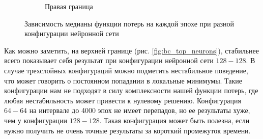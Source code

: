 \begin{figure}[ht]
    \hspace{0.5cm}
    \begin{subfigure}[b]{0.4\textwidth}
        \caption{Правая граница}
        \label{fig:bc_right_neurons}
    \end{subfigure}
    \caption{Зависимость медианы функции потерь на каждой эпохе при разной конфигурации нейронной сети}
    \label{fig:bc_loss_neurons}
\end{figure}

Как можно заметить, на верхней границе (рис. \ref{fig:bc_top_neurons}), стабильнее
всего показывает себя результат при конфигурации нейронной сети $128-128$. В
случае трехслойных конфигураций можно подметить нестабильное поведение, что
может говорить о постоянном попадании в локальные минимумы. Такие конфигурации
нам не подходят в силу комплексности нашей функции потерь, где любая
нестабильность может привести к нулевому решению. Конфигурация $64-64$
на интервале до 4000 эпох не имеет перепадов, но ее результаты хуже,
чем у конфигурации $128-128$. Такая конфигурация может быть полезна, 
если нужно получить не очень точные результаты за короткий промежуток
времени.


